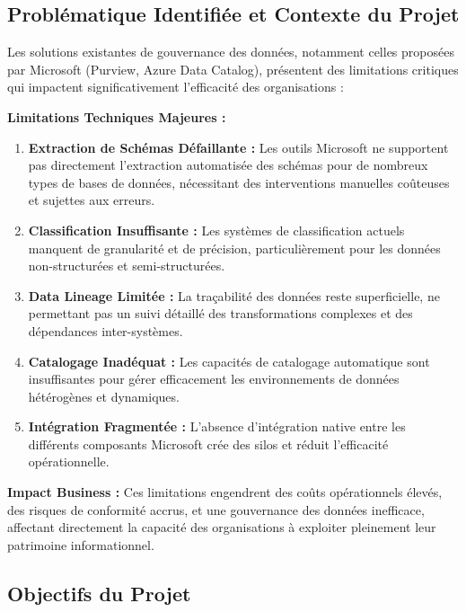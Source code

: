 \documentclass[a4paper,12pt]{article}
\begin{document}
\subsection{Problématique Identifiée et Contexte du Projet}

Les solutions existantes de gouvernance des données, notamment celles proposées par Microsoft (Purview, Azure Data Catalog), présentent des limitations critiques qui impactent significativement l'efficacité des organisations :

\textbf{Limitations Techniques Majeures :}
\begin{enumerate}
    \item \textbf{Extraction de Schémas Défaillante :} Les outils Microsoft ne supportent pas directement l'extraction automatisée des schémas pour de nombreux types de bases de données, nécessitant des interventions manuelles coûteuses et sujettes aux erreurs.
    
    \item \textbf{Classification Insuffisante :} Les systèmes de classification actuels manquent de granularité et de précision, particulièrement pour les données non-structurées et semi-structurées.
    
    \item \textbf{Data Lineage Limitée :} La traçabilité des données reste superficielle, ne permettant pas un suivi détaillé des transformations complexes et des dépendances inter-systèmes.
    
    \item \textbf{Catalogage Inadéquat :} Les capacités de catalogage automatique sont insuffisantes pour gérer efficacement les environnements de données hétérogènes et dynamiques.
    
    \item \textbf{Intégration Fragmentée :} L'absence d'intégration native entre les différents composants Microsoft crée des silos et réduit l'efficacité opérationnelle.
\end{enumerate}

\textbf{Impact Business :}
Ces limitations engendrent des coûts opérationnels élevés, des risques de conformité accrus, et une gouvernance des données inefficace, affectant directement la capacité des organisations à exploiter pleinement leur patrimoine informationnel.

\subsection{Objectifs du Projet}
\end{document}

